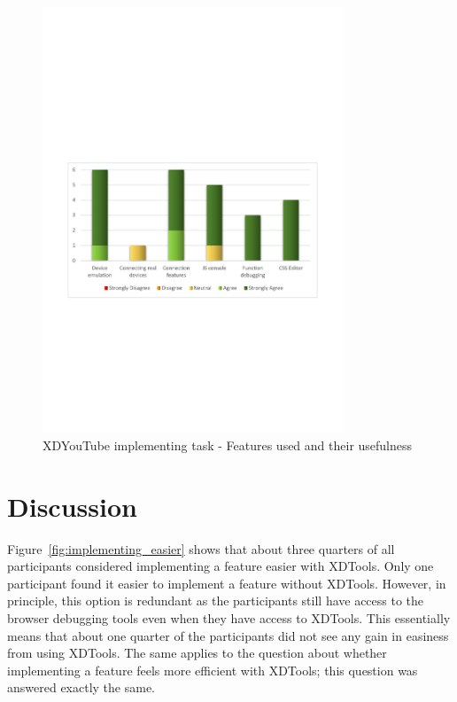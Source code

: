 \begin{figure}[H]
  \centering
    \includegraphics[width=0.8\textwidth]{images/charts/xdyt_impl_features_used.pdf}
	\caption[xdyt-impl: Features used]{XDYouTube implementing task - Features used and their usefulness}
	\label{fig:xdyt_impl_features_used}
\end{figure}

\section{Discussion}

Figure~\ref{fig:implementing_easier} shows that about three quarters of all participants considered implementing a feature easier with XDTools. Only one participant found it easier to implement a feature without XDTools. However, in principle, this option is redundant as the participants still have access to the browser debugging tools even when they have access to XDTools. This essentially means that about one quarter of the participants did not see any gain in easiness from using XDTools. The same applies to the question about whether implementing a feature feels more efficient with XDTools; this question was answered exactly the same.

